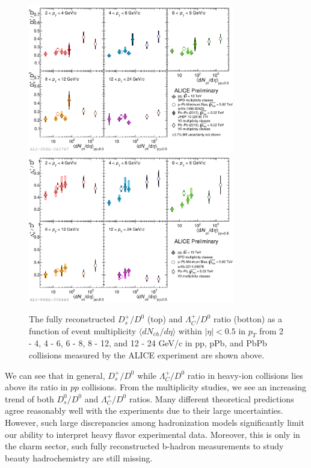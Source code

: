 \begin{figure}[hbtp]
\begin{center}
\includegraphics[width=0.80\textwidth]{Figures/Chapter2/ALICEDsD0Multi.pdf}
\includegraphics[width=0.80\textwidth]{Figures/Chapter2/ALICELambdaD0Multi.pdf}
\caption{The fully reconstructed $D^+_s/D^0$ (top) and $\Lambda_C^+/D^0$ ratio (botton) as a function of event multiplicity $\langle dN_{ch}/d\eta \rangle$ within $|\eta| < 0.5$ in $p_T$ from 2 - 4, 4 - 6, 6 - 8, 8 - 12, and 12 - 24 GeV/c in pp, pPb, and PbPb collisions measured by the ALICE experiment are shown above.}
\label{ALICEMulti}
\end{center}
\end{figure}   





We can see that in general, $D_s^+/D^0$ while $\Lambda_C^+/D^0$ ratio in heavy-ion collisions lies above its ratio in $pp$ collisions. From the multiplicity studies, we see an increasing trend of both $D^0_s/D^0$ and $\Lambda_C^+/D^0$ ratios. Many different theoretical predictions agree reasonably well with the experiments due to their large uncertainties. However, such large discrepancies among hadronization models significantly limit our ability to interpret heavy flavor experimental data. Moreover, this is only in the charm sector, such fully reconstructed b-hadron measurements to study beauty hadrochemistry are still missing. 


